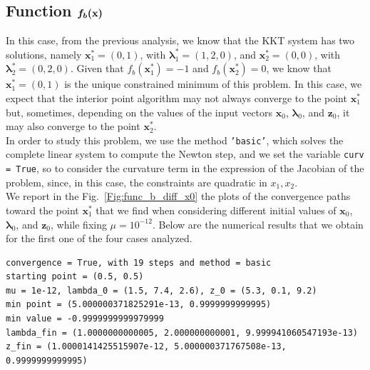 \documentclass[a4paper,11pt]{article}
\begin{document}
\subsection*{Function $\boldmath{f_{b}}(\textbf{x})$}
In this case, from the previous analysis, we know that the KKT system has two solutions, namely $\textbf{x}^*_{1}=(0,1)$, with $\boldsymbol{\lambda}_{1}^*=(1,2,0)$, and $\textbf{x}^*_{2}=(0,0)$, with $\boldsymbol{\lambda}_{2}^*=(0,2,0)$. Given that $f_{b}(\textbf{x}_{1}^*) = -1$ and $f_{b}(\textbf{x}_{2}^*) = 0$, we know that $\textbf{x}^*_{1}=(0,1)$ is the unique constrained minimum of this problem. In this case, we expect that the interior point algorithm may not always converge to the point $\textbf{x}^*_{1}$ but, sometimes, depending on the values of the input vectors $\textbf{x}_{0}$, $\boldsymbol{\lambda}_{0}$, and $\textbf{z}_{0}$, it may also converge to the point $\textbf{x}^*_{2}$.\\

\noindent In order to study this problem, we use the method \texttt{'basic'}, which solves the complete linear system to compute the Newton step, and we set the variable \texttt{curv = True}, so to consider the curvature term in the expression of the Jacobian of the problem, since, in this case, the constraints are quadratic in $x_{1},x_{2}$.\\

\noindent We report in the Fig.~\ref{Fig:func_b_diff_x0} the plots of the convergence paths toward the point $\textbf{x}^*_{1}$ that we find when considering different initial values of $\textbf{x}_{0}$, $\boldsymbol{\lambda}_{0}$, and $\textbf{z}_{0}$, while fixing $\mu=10^{-12}$. Below are the numerical results that we obtain for the first one of the four cases analyzed.
\begin{verbatim}
convergence = True, with 19 steps and method = basic
starting point = (0.5, 0.5)
mu = 1e-12, lambda_0 = (1.5, 7.4, 2.6), z_0 = (5.3, 0.1, 9.2)        
min point = (5.000000371825291e-13, 0.9999999999995)
min value = -0.9999999999979999
lambda_fin = (1.0000000000005, 2.000000000001, 9.999941060547193e-13)   
z_fin = (1.0000141425515907e-12, 5.000000371767508e-13, 0.9999999999995)
\end{verbatim}
\end{document}

